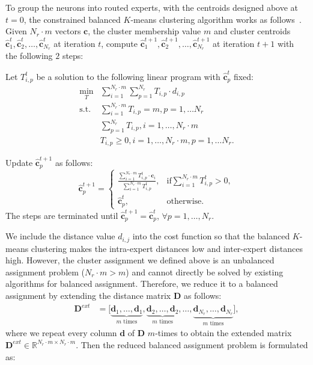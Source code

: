 To group the neurons into routed experts, with the centroids designed above at $t = 0$, the constrained balanced $K$-means clustering algorithm works as follows~\cite{malinen2014balanced}. Given $N_r\cdot m$ vectors $\mathbf{c}$, the cluster membership value $m$ and cluster centroids $\hat{\mathbf{c}}_1^{t}, \hat{\mathbf{c}}_2^{t}, \dots, \hat{\mathbf{c}}_{N_r}^{t}$ at iteration $t$, compute $\hat{\mathbf{c}}_1^{t+1}, \hat{\mathbf{c}}_2^{t+1}, \dots, \hat{\mathbf{c}}_{N_r}^{t+1}$ at iteration $t+1$ with the following $2$ steps: 

Let $T_{i,p}^{t}$ be a solution to the following linear program with $\hat{\mathbf{c}}_{p}^{t}$ fixed:
\begin{align}
    \min_{T} &\sum_{i=1}^{N_r\cdot m} \sum_{p=1}^{N_r} T_{i,p}\cdot d_{i,p} \\
    \text{s.t.} &\sum_{i=1}^{N_r\cdot m} T_{i,p} = m, p = 1, \dots N_r \label{eq:con_1} \nonumber \\
    &\sum_{p=1}^{N_r} T_{i,p}, i = 1, \dots,N_r\cdot m \nonumber \\
    &T_{i,p} \geq 0, i = 1, \dots,N_r\cdot m, p = 1, \dots N_r. \nonumber
\end{align}

Update $\hat{\mathbf{c}}_{p}^{t+1}$ as follows:
\begin{equation}
    \hat{\mathbf{c}}_{p}^{t+1} = \left\{ 
    \begin{array}{ll}
        \frac{\sum_{i=1}^{N_r\cdot m} T_{i,p}^{t}\cdot \mathbf{c}_i}{\sum_{i=1}^{N_r\cdot m}T_{i,p}^{t}},  
        &\text{if} \sum_{i=1}^{N_r\cdot m} T_{i,p}^{t}> 0,  \\ 
        \hat{\mathbf{c}}_{p}^{t},  
        &\text{otherwise}.
    \end{array}\right.
\end{equation}
The steps are terminated until $\hat{\mathbf{c}}_{p}^{t+1} = \hat{\mathbf{c}}_{p}^{t}$, $\forall p = 1,\dots,N_r$.

We include the distance value $d_{i,j}$ into the cost function so that the balanced $K$-means clustering makes the intra-expert distances low and inter-expert distances high.
However, the cluster assignment we defined above is an unbalanced assignment problem ($N_r\cdot m > m$) and cannot directly be solved by existing algorithms for balanced assignment.
Therefore, we reduce it to a balanced assignment by extending the distance matrix $\mathbf{D}$ as follows:
\begin{align*}
    \mathbf{D}^{ext} &= \big[ 
\underbrace{\mathbf{d}_1, \dots, \mathbf{d}_1}_{m \text{ times}}, 
\underbrace{\mathbf{d}_2, \dots, \mathbf{d}_2}_{m \text{ times}}, 
\dots, 
\underbrace{\mathbf{d}_{N_r},  \dots, \mathbf{d}_{N_r}}_{m \text{ times}} 
\big],
\end{align*}
where we repeat every column $\mathbf{d}$ of $\mathbf{D}$ $m$-times to obtain the extended matrix $\mathbf{D}^{ext} \in \mathbb{R}^{N_r\cdot m \times N_r\cdot m}$.
Then the reduced balanced assignment problem is formulated as:

